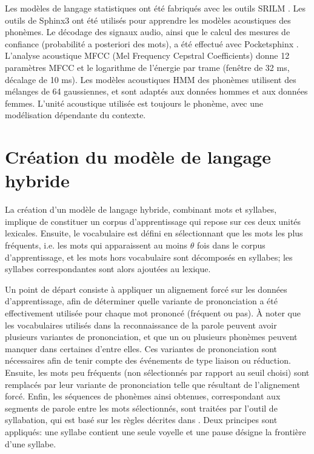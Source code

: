 \documentclass[10pt,a4paper,twoside]{article}
\begin{document}
Les modèles de langage statistiques ont été fabriqués avec les outils SRILM \cite{Stolcke2002}. 
Les outils de Sphinx3 \cite{Placeway1996} ont été utilisés pour apprendre les modèles acoustiques des phonèmes. 
Le décodage des signaux audio, ainsi que le calcul des mesures de confiance (probabilité a posteriori des mots), a été effectué avec Pocketsphinx \cite{Huggins2006}. 
L'analyse acoustique MFCC (Mel Frequency Cepstral Coefficients) donne 12 paramètres MFCC et le logarithme de l'énergie par trame (fenêtre de 32 ms, décalage de 10 ms). 
Les modèles acoustiques HMM des phonèmes utilisent des mélanges de 64 gaussiennes, et sont adaptés aux données hommes et aux données femmes. 
L'unité acoustique utilisée est toujours le phonème, avec une modélisation dépendante du contexte.


\section{Création du modèle de langage hybride}

La création d'un modèle de langage hybride, combinant mots et syllabes, implique de constituer un corpus d'apprentissage qui repose sur ces deux unités lexicales. Ensuite, le vocabulaire est défini en sélectionnant que les mots les plus fréquents, i.e. les mots qui apparaissent au moins $\theta$ fois dans le corpus d'apprentissage, et les mots hors vocabulaire sont décomposés en syllabes; les syllabes correspondantes sont alors ajoutées au lexique.

Un point de départ consiste à appliquer un alignement forcé sur les données d'apprentissage, afin de déterminer quelle variante de prononciation a été effectivement utilisée pour chaque mot prononcé (fréquent ou pas). À noter que les vocabulaires utilisés dans la reconnaissance de la parole peuvent avoir plusieurs variantes de prononciation, et que un ou plusieurs phonèmes peuvent manquer dans certaines d'entre elles. Ces variantes de prononciation sont nécessaires afin de tenir compte des événements de type liaison ou réduction. Ensuite, les mots peu fréquents (non sélectionnés par rapport au seuil choisi) sont remplacés par leur variante de prononciation telle que résultant de l'alignement forcé. Enfin, les séquences de phonèmes ainsi obtenues, correspondant aux segments de parole entre les mots sélectionnés, sont traitées par l'outil de syllabation, qui est basé sur les règles décrites dans \cite{Bigi2010}. Deux principes sont appliqués: une syllabe contient une seule voyelle et une pause désigne la frontière d'une syllabe.
\end{document}
